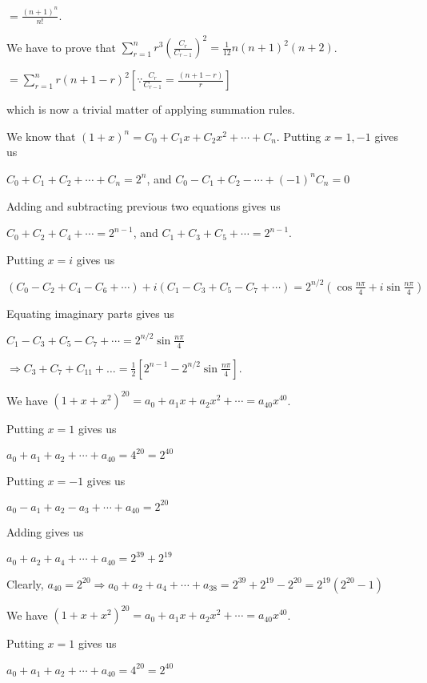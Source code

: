   $= \frac{(n + 1)^n}{n!}$.
\item We have to prove that $\displaystyle\sum_{r=1}^nr^3\left(\frac{C_r}{C_{r - 1}}\right)^2 =
  \frac{1}{12}n(n + 1)^2(n + 2)$.

  $= \displaystyle\sum_{r = 1}^nr(n + 1 - r)^2[\because \frac{C_{r}}{C_{r - 1}} = \frac{(n + 1 - r)}{r}]$

  which is now a trivial matter of applying summation rules.
\item We know that $(1 + x)^n = C_0 + C_1x + C_2x^2 + \cdots + C_n$. Putting $x = 1, - 1$ gives us

  $C_0 + C_1 + C_2 + \cdots + C_n = 2^n$, and $C_0 - C_1 + C_2 - \cdots + (-1)^nC_n = 0$

  Adding and subtracting previous two equations gives us

  $C_0 + C_2 + C_4 + \cdots = 2^{n - 1}$, and $C_1 + C_3 + C_5 + \cdots = 2^{n - 1}$.

  Putting $x = i$ gives us

  $(C_0 - C_2 + C_4 - C_6 + \cdots) + i(C_1 - C_3 + C_5 - C_7 + \cdots) = 2^{n/2}\left(\cos\frac{n\pi}{4} +
  i\sin\frac{n\pi}{4}\right)$

  Equating imaginary parts gives us

  $C_1 - C_3 + C_5 - C_7 + \cdots = 2^{n/2}\sin\frac{n\pi}{4}$

  $\Rightarrow C_3 + C_7 + C_{11} + \ldots = \frac{1}{2}\left[2^{n - 1} - 2^{n/2}\sin\frac{n\pi}{4}\right]$.
\item We have $(1 + x + x^2)^{20} = a_0 + a_1x + a_2x^2 + \cdots = a_{40}x^{40}$.

  Putting $x = 1$ gives us

  $a_0 + a_1 + a_2 + \cdots + a_{40} = 4^{20} = 2^{40}$

  Putting $x = -1$ gives us

  $a_0 - a_1 + a_2 - a_3 + \cdots + a_{40} = 2^{20}$

  Adding gives us

  $a_0 + a_2 + a_4 + \cdots + a_{40} = 2^{39} + 2^{19}$

  Clearly, $a_{40} = 2^{20}\Rightarrow a_0 + a_2 + a_4 + \cdots + a_{38} = 2^{39} + 2^{19} - 2^{20} =
  2^{19}(2^{20} - 1)$
\item We have $(1 + x + x^2)^{20} = a_0 + a_1x + a_2x^2 + \cdots = a_{40}x^{40}$.

  Putting $x = 1$ gives us

  $a_0 + a_1 + a_2 + \cdots + a_{40} = 4^{20} = 2^{40}$


